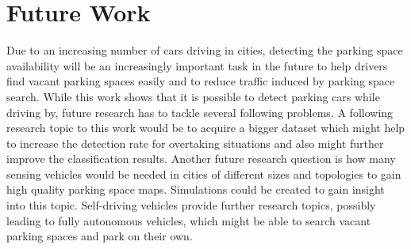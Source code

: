 \section{Future Work}
Due to an increasing number of cars driving in cities, detecting the parking space availability will be an increasingly important task in the future to help drivers find vacant parking spaces easily and to reduce traffic induced by parking space search. While this work shows that it is possible to detect parking cars while driving by, future research has to tackle several following problems. A following research topic to this work would be to acquire a bigger dataset which might help to increase the detection rate for overtaking situations and also might further improve the classification results. Another future research question is how many sensing vehicles would be needed in cities of different sizes and topologies to gain high quality parking space maps. Simulations could be created to gain insight into this topic. Self-driving vehicles provide further research topics, possibly leading to fully autonomous vehicles, which might be able to search vacant parking spaces and park on their own.









